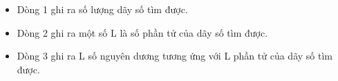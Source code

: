 \begin{itemize}
	\item     Dòng 1 ghi ra số lượng dãy số tìm được.   
	\item     Dòng 2 ghi ra một số L là số phần tử của dãy số tìm được.   
	\item     Dòng 3 ghi ra L số nguyên dương tương ứng với L phần tử của dãy số tìm được.   
\end{itemize}